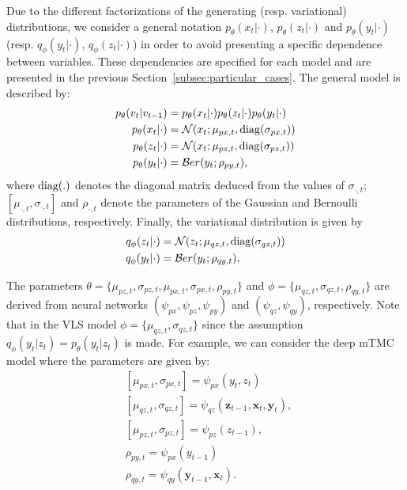 \documentclass{article}
\def\x{{\mathbf x}}
\def\z{{\mathbf z}}
\def\y{{\mathbf y}}
\def\N{{\mathcal N}}
\def\Ber{{\mathcal Ber}}
\def\p{p_{\theta}}
\def\q{q_\phi}
\newtheorem{example}{Example}
\begin{document}
Due to the different factorizations of the generating (resp. variational)
distributions, we consider a general notation
$\p(x_t | \cdot)$, $\p(z_t| \cdot)$ and $\p(y_t | \cdot)$ 
(resp. $\q(y_t | \cdot)$, $\q(z_t | \cdot)$) 
in order to avoid presenting a specific dependence between variables. 
These dependencies are specified for each model and are presented in the previous
Section~\ref{subsec:particular_cases}.
The general model is described by:
\begin{align}
    \p(v_t|v_{t-1}) &=  \p(x_t|\cdot) \p(z_t|\cdot)\p(y_t|\cdot) \nonumber\\
\label{eq:px}
    \p(x_t | \cdot) &= \N(x_t; \mu_{px, t}, {\rm diag}(\sigma_{px,t}) ) \\
\label{eq:pz}
    \p(z_t | \cdot) &= \N(x_t; \mu_{pz, t}, {\rm diag}(\sigma_{pz,t}) ) \\
\label{eq:py}
    \p(y_t | \cdot) &= \Ber(y_t;  \rho_{py,t}) \text{,}
\end{align}
where ${\rm diag(.)}$ denotes the diagonal matrix deduced from the values 
of $\sigma_{\cdot,t}$;   $[\mu_{\cdot,t}, \sigma_{\cdot,t}]$  and $\rho_{\cdot,t}$ denote 
the parameters of the Gaussian and Bernoulli distributions, respectively. 
Finally, the variational distribution is given by
\begin{align}
\label{eq:qz}
    \q(z_t | \cdot) &=  \N(z_t; \mu_{qz, t}, {\rm diag}(\sigma_{qz,t}) )\\  
\label{eq:qy}
    \q(y_t | \cdot) &=  \Ber(y_t;  \rho_{qy,t}) \text{,} 
\end{align}

The parameters $\theta = \{\mu_{pz,t}, \sigma_{pz,t}, \mu_{px,t}, \sigma_{px,t}, \rho_{py,t}\}$  
and $\phi = \{ \mu_{qz,t}, \sigma_{qz,t} , \rho_{qy,t}\}$ are derived from 
neural networks $(\psi_{px}, \psi_{pz}, \psi_{py})$ and 
$(\psi_{qz}, \psi_{qy})$, respectively.
Note that in the VLS model $\phi = \{ \mu_{qz,t}, \sigma_{qz,t} \}$ since 
the assumption $\q(y_t | z_t) = \p(y_t | z_t)$ is made. 
For example, we can consider the deep mTMC model where the parameters are given by:
\begin{align*}
    &[\mu_{px,t}, \sigma_{px,t}]  = \psi_{px}(y_t, z_t)\\
    &[\mu_{qz,t}, \sigma_{qz,t}] = \psi_{qz}( \z_{t-1},\x_t, \y_t )\text{, }\\
    &[\mu_{pz,t}, \sigma_{pz,t}]  = \psi_{pz }(z_{t-1}), \\
    &\rho_{py,t}  = \psi_{px}(y_{t-1})\\
    &\rho_{qy,t}  = \psi_{qy}(\y_{t-1}, \x_t) \text{.}
\end{align*} 
\end{document}
